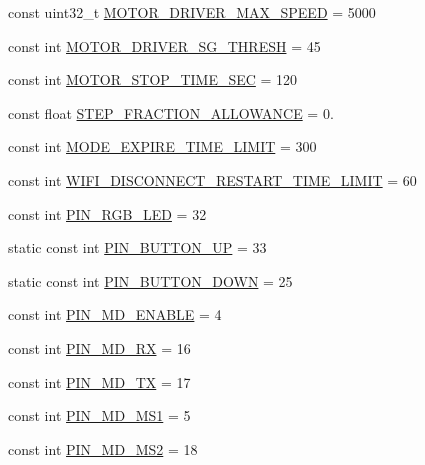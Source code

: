 \begin{DoxyCompactItemize}
\item 
const uint32\+\_\+t \hyperlink{namespaceCONFIG__SET_ad8683609012e266d026138915afb2c4c}{M\+O\+T\+O\+R\+\_\+\+D\+R\+I\+V\+E\+R\+\_\+\+M\+A\+X\+\_\+\+S\+P\+E\+ED} = 5000
\item 
const int \hyperlink{namespaceCONFIG__SET_a56ca50a3b66685f81410683733371590}{M\+O\+T\+O\+R\+\_\+\+D\+R\+I\+V\+E\+R\+\_\+\+S\+G\+\_\+\+T\+H\+R\+E\+SH} = 45
\item 
const int \hyperlink{namespaceCONFIG__SET_a4cfa726833e14a8607e9c4c8b5895792}{M\+O\+T\+O\+R\+\_\+\+S\+T\+O\+P\+\_\+\+T\+I\+M\+E\+\_\+\+S\+EC} = 120
\item 
const float \hyperlink{namespaceCONFIG__SET_ae98d33bba82717c83e577914428d2f87}{S\+T\+E\+P\+\_\+\+F\+R\+A\+C\+T\+I\+O\+N\+\_\+\+A\+L\+L\+O\+W\+A\+N\+CE} = 0.
\item 
const int \hyperlink{namespaceCONFIG__SET_a4e51168ed48d5e6ff6bdd26da8fd0244}{M\+O\+D\+E\+\_\+\+E\+X\+P\+I\+R\+E\+\_\+\+T\+I\+M\+E\+\_\+\+L\+I\+M\+IT} = 300
\item 
const int \hyperlink{namespaceCONFIG__SET_a538190e043ad035b08b9fc653d6a0491}{W\+I\+F\+I\+\_\+\+D\+I\+S\+C\+O\+N\+N\+E\+C\+T\+\_\+\+R\+E\+S\+T\+A\+R\+T\+\_\+\+T\+I\+M\+E\+\_\+\+L\+I\+M\+IT} = 60
\item 
const int \hyperlink{namespaceCONFIG__SET_a932d38d647f5793b7ebb07de5c7baf7b}{P\+I\+N\+\_\+\+R\+G\+B\+\_\+\+L\+ED} = 32
\item 
static const int \hyperlink{namespaceCONFIG__SET_a2a69cb92b89581f4a67d29a1a808327b}{P\+I\+N\+\_\+\+B\+U\+T\+T\+O\+N\+\_\+\+UP} = 33
\item 
static const int \hyperlink{namespaceCONFIG__SET_a5bf40b051395303a194e7afab2a66d43}{P\+I\+N\+\_\+\+B\+U\+T\+T\+O\+N\+\_\+\+D\+O\+WN} = 25
\item 
const int \hyperlink{namespaceCONFIG__SET_a76e1dbd32a24123a8e1c6f1032553e9e}{P\+I\+N\+\_\+\+M\+D\+\_\+\+E\+N\+A\+B\+LE} = 4
\item 
const int \hyperlink{namespaceCONFIG__SET_a3cd5a807c53edf90423ef292df549a2c}{P\+I\+N\+\_\+\+M\+D\+\_\+\+RX} = 16
\item 
const int \hyperlink{namespaceCONFIG__SET_ae14a96410643d22f30b5e7f98bbc2e98}{P\+I\+N\+\_\+\+M\+D\+\_\+\+TX} = 17
\item 
const int \hyperlink{namespaceCONFIG__SET_af93fc82a783571bf68af757e1a59be8d}{P\+I\+N\+\_\+\+M\+D\+\_\+\+M\+S1} = 5
\item 
const int \hyperlink{namespaceCONFIG__SET_a3ae1a9238a4c2ef99018a568fb407188}{P\+I\+N\+\_\+\+M\+D\+\_\+\+M\+S2} = 18

\end{DoxyCompactItemize}
